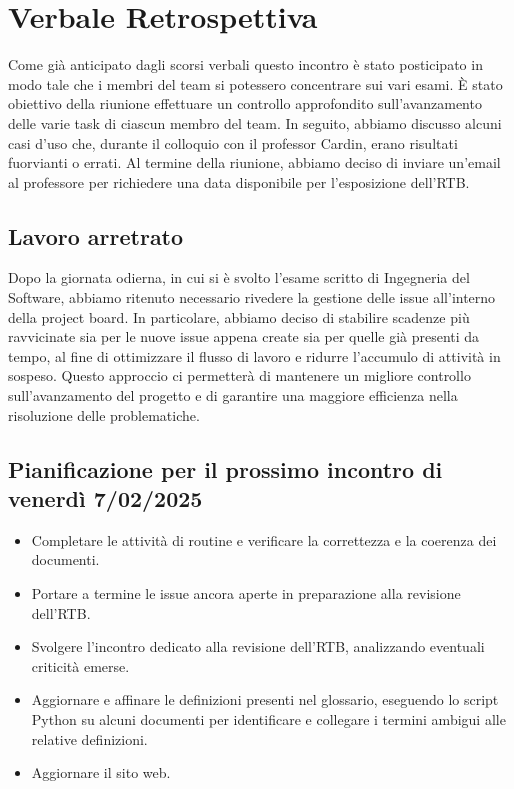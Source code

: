 \documentclass{article}
\begin{document}
\section{Verbale Retrospettiva}
Come già anticipato dagli scorsi verbali questo incontro è stato posticipato in modo tale che i membri del team si potessero concentrare sui vari esami. È stato obiettivo della riunione effettuare un controllo approfondito sull'avanzamento delle varie task di ciascun membro del team. In seguito, abbiamo discusso alcuni casi d'uso che, durante il colloquio con il professor Cardin, erano risultati fuorvianti o errati. Al termine della riunione, abbiamo deciso di inviare un'email al professore per richiedere una data disponibile per l'esposizione dell'RTB.
\subsection{Lavoro arretrato}
Dopo la giornata odierna, in cui si è svolto l'esame scritto di Ingegneria del Software, abbiamo ritenuto necessario rivedere la gestione delle issue all'interno della project board. In particolare, abbiamo deciso di stabilire scadenze più ravvicinate sia per le nuove issue appena create sia per quelle già presenti da tempo, al fine di ottimizzare il flusso di lavoro e ridurre l'accumulo di attività in sospeso. Questo approccio ci permetterà di mantenere un migliore controllo sull'avanzamento del progetto e di garantire una maggiore efficienza nella risoluzione delle problematiche.

\subsection{Pianificazione per il prossimo incontro di venerdì 7/02/2025}
\begin{itemize}
    \item Completare le attività di routine e verificare la correttezza e la coerenza dei documenti.
    \item Portare a termine le issue ancora aperte in preparazione alla revisione dell'RTB.
    \item Svolgere l'incontro dedicato alla revisione dell'RTB, analizzando eventuali criticità emerse.
    \item Aggiornare e affinare le definizioni presenti nel glossario, eseguendo lo script Python su alcuni documenti per identificare e collegare i termini ambigui alle relative definizioni.
    \item Aggiornare il sito web.
\end{itemize}
\end{document}
